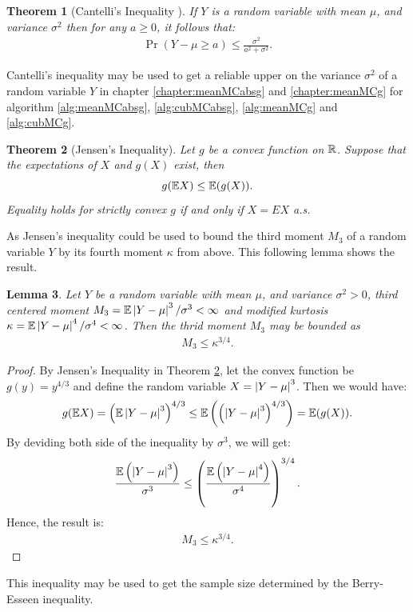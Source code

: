 \documentclass{iitthesis}
\newtheorem{theorem}{Theorem}[section]
\newtheorem{lemma}[theorem]{Lemma}
\begin{document}
\begin{theorem}[Cantelli's Inequality {\cite[6.1.e]{LB10}}]\label{CanThm} If $Y$ is a random variable with mean $\mu$, and variance $\sigma^2$ then for any $a \geq 0$, it follows that: 
\begin{align}
\Pr(Y-\mu \ge a) \le  \frac{\sigma^2}{a^2+\sigma^2}.
\end{align}
\end{theorem}
Cantelli's inequality may be used to get a reliable upper on the variance $\sigma^2$ of a random variable $Y$ in chapter \ref{chapter:meanMCabsg} and \ref{chapter:meanMCg} for algorithm \ref{alg:meanMCabsg}, \ref{alg:cubMCabsg}, \ref{alg:meanMCg} and \ref{alg:cubMCg}.

\begin{theorem}[Jensen's Inequality{\cite[8.4a]{LB10}}]\label{Jensen}
Let $g$ be a convex function on $\mathbb{R}$. Suppose that the expectations of $X$ and $g(X)$ exist, then
$$g(\mathbb{E} X) \leq \mathbb{E}(g(X)).$$
Equality holds for strictly convex $g$ if and only if $X=EX$ a.s.
\end{theorem}
As Jensen's inequality could be used to bound the third moment $M_3$ of a random variable $Y$ by its fourth moment $\kappa$ from above. This following lemma shows the result.
\begin{lemma}\label{M3kappalemma}
Let $Y$ be a random variable with mean $\mu$, and variance $\sigma^2>0$, third centered moment $M_3 = \mathbb{E}\left \lvert Y-\mu \right \rvert^3/\sigma^3 < \infty$ and modified kurtosis $\kappa = \mathbb{E}\left \lvert Y-\mu \right \rvert^4/\sigma^4< \infty$. Then the thrid moment $M_3$ may be bounded as 
\begin{align}\label{M3kappa}
M_3\leq \kappa^{3/4}.
\end{align}
\end{lemma}
\begin{proof}
By Jensen's Inequality in Theorem \ref{Jensen}, let the convex function be $g(y) = y^{4/3}$ and define the random variable $X = \left \lvert Y-\mu \right \rvert^3$. Then we would have:
$$g(\mathbb{E} X) = \left (\mathbb{E}\left \lvert Y-\mu \right \rvert^3\right)^{4/3} \leq \mathbb{E}\left(\left(\left \lvert Y-\mu \right \rvert^3\right)^{4/3}\right) = \mathbb{E}(g(X)).$$
By deviding both side of the inequality by $\sigma^3$, we will get:
$$\frac{\mathbb{E}\left(\left \lvert Y-\mu \right \rvert^3\right)}{\sigma^3} \leq \left (\frac{\mathbb{E}\left(\left \lvert Y-\mu \right \rvert^4\right)}{\sigma^4}\right)^{3/4}.$$
Hence, the result is: 
\begin{align}
M_3\leq \kappa^{3/4}.
\end{align}
\end{proof}
This inequality may be used to get the sample size determined by the Berry-Esseen inequality.
\end{document}
